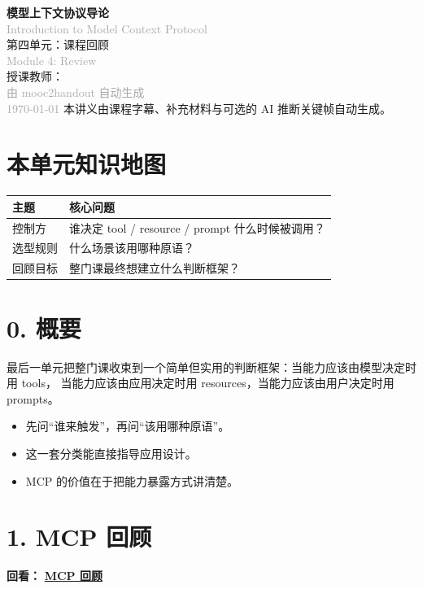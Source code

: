 \documentclass[UTF8,a4paper,11pt]{ctexart}
\newcommand{\videolink}[2]{%
  \href{#1}{\textcolor{videoblue}{\textbf{#2}}}%
}
\begin{document}
\begin{center}
  \vspace*{2cm}
  {\Huge\bfseries\color{accent} 模型上下文协议导论}\\[0.3cm]
  {\small\textcolor{darkgray}{Introduction to Model Context Protocol}}\\[0.8cm]
  {\LARGE 第四单元：课程回顾}\\[0.3cm]
  {\small\textcolor{darkgray}{Module 4: Review}}\\[1.2cm]
  {\large 授课教师： }\\[0.5cm]
  {\large\textcolor{darkgray}{由 mooc2handout 自动生成}}\\[0.3cm]
  {\small\textcolor{darkgray}{\today}}
  \vfill
  {\small 本讲义由课程字幕、补充材料与可选的 AI 推断关键帧自动生成。}
\end{center}
\newpage

\tableofcontents
\newpage

\section*{本单元知识地图}
\begin{longtable}{p{3.1cm}p{10.2cm}}
\toprule
主题 & 核心问题 \\
\midrule
控制方 & 谁决定 tool / resource / prompt 什么时候被调用？ \\
选型规则 & 什么场景该用哪种原语？ \\
回顾目标 & 整门课最终想建立什么判断框架？ \\
\bottomrule
\end{longtable}

\section*{0. 概要}
最后一单元把整门课收束到一个简单但实用的判断框架：当能力应该由模型决定时用 tools，
当能力应该由应用决定时用 resources，当能力应该由用户决定时用 prompts。

\begin{itemize}
  \item 先问“谁来触发”，再问“该用哪种原语”。
  \item 这一套分类能直接指导应用设计。
  \item MCP 的价值在于把能力暴露方式讲清楚。
\end{itemize}

\section*{1. MCP 回顾}
\noindent\textbf{回看：}\videolink{https://www.coursera.org/learn/introduction-to-model-context-protocol/home/module/4}{MCP 回顾}
\end{document}
